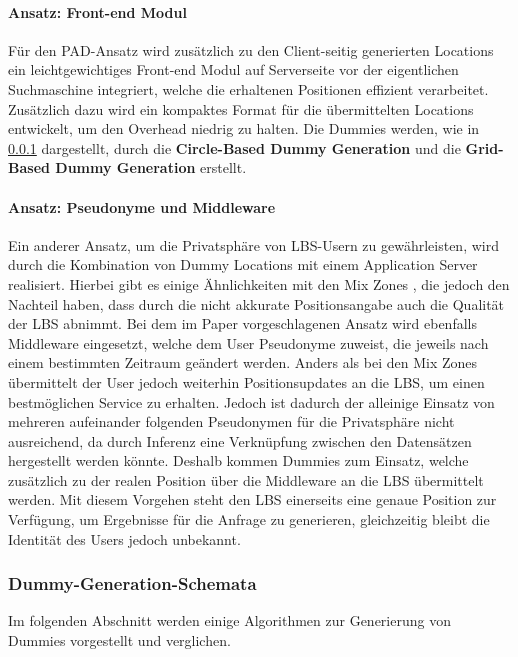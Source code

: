 \paragraph{Ansatz: Front-end Modul \cite{Lu2008}} \label{para:modul}
Für den PAD-Ansatz wird zusätzlich zu den Client-seitig generierten Locations ein leichtgewichtiges Front-end Modul auf Serverseite vor der eigentlichen Suchmaschine integriert, welche die erhaltenen Positionen effizient verarbeitet. Zusätzlich dazu wird ein kompaktes Format für die übermittelten Locations entwickelt, um den Overhead niedrig zu halten. Die Dummies werden, wie in \ref{subsubsection:dgschema} dargestellt, durch die \textbf{Circle-Based Dummy Generation} und die \textbf{Grid-Based Dummy Generation} erstellt.

\paragraph{Ansatz: Pseudonyme und Middleware \cite{Sahu2012}} \label{para:middle}
Ein anderer Ansatz, um die Privatsphäre von LBS-Usern zu gewährleisten, wird durch die Kombination von Dummy Locations mit einem Application Server realisiert. Hierbei gibt es einige Ähnlichkeiten mit den Mix Zones \cite{Beresford2003}, die jedoch den Nachteil haben, dass durch die nicht akkurate Positionsangabe auch die Qualität der LBS abnimmt. Bei dem im Paper vorgeschlagenen Ansatz wird ebenfalls Middleware eingesetzt, welche dem User Pseudonyme zuweist, die jeweils nach einem bestimmten Zeitraum geändert werden. Anders als bei den Mix Zones übermittelt der User jedoch weiterhin Positionsupdates an die LBS, um einen bestmöglichen Service zu erhalten. Jedoch ist dadurch der alleinige Einsatz von mehreren aufeinander folgenden Pseudonymen für die Privatsphäre nicht ausreichend, da durch Inferenz eine Verknüpfung zwischen den Datensätzen hergestellt werden könnte. Deshalb kommen Dummies zum Einsatz, welche zusätzlich zu der realen Position über die Middleware an die LBS übermittelt werden. Mit diesem Vorgehen steht den LBS einerseits eine genaue Position zur Verfügung, um Ergebnisse für die Anfrage zu generieren, gleichzeitig bleibt die Identität des Users jedoch unbekannt.

\subsubsection{Dummy-Generation-Schemata} \label{subsubsection:dgschema}
Im folgenden Abschnitt werden einige Algorithmen zur Generierung von Dummies vorgestellt und verglichen.

